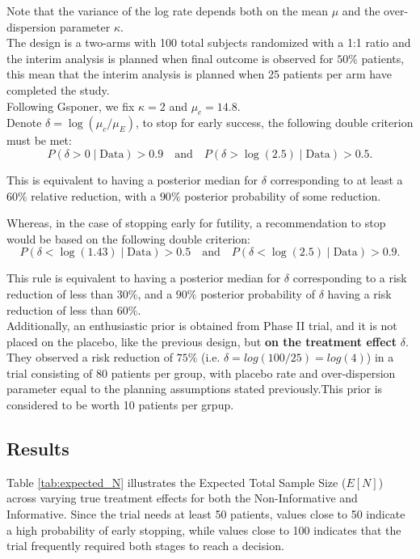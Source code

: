 \documentclass{article}\usepackage[]{graphicx}\usepackage[]{xcolor}
\begin{document}
Note that the variance of the log rate depends both on the mean $\mu$ and the over-dispersion parameter $\kappa$. \\

The design is a two-arms with 100 total subjects randomized with a 1:1 ratio and the interim analysis is planned
when final outcome is observed for $50\%$ patients, this mean that the interim analysis is planned when 25 patients per arm have completed the study.\\
Following Gsponer\cite{gsponer2014bayesian}, we fix $\kappa = 2$ and $\mu_c = 14.8$. \\
Denote $\delta = \log (\mu_c / \mu_E)$, to stop for early success, the following double criterion must be met: 
\[
P(\delta > 0 \mid \mathrm{Data}) > 0.9
\quad\text{and}\quad
P\!\left(\delta > \log(2.5)\mid \mathrm{Data}\right) > 0.5.
\]

This is equivalent to having a posterior median for \(\delta\) corresponding to at least a \(60\%\) relative reduction, with a \(90\%\) posterior probability of some reduction.

Whereas, in the case of stopping early for futility, a recommendation to stop would be based on the following double criterion:
\[
P\!\left(\delta < \log(1.43)\mid \mathrm{Data}\right) > 0.5
\quad\text{and}\quad
P\!\left(\delta < \log(2.5)\mid \mathrm{Data}\right) > 0.9.
\]
 
This rule is equivalent to having a posterior median for \(\delta\) corresponding to a risk reduction of less than \(30\%\), and a \(90\%\) posterior probability of \(\delta\) having a risk reduction of less than \(60\%\).\\

Additionally, an enthusiastic prior is obtained from Phase II trial, and it is not placed on the placebo, like the previous design, but \textbf{on the treatment effect} $\delta$. 
They observed a risk reduction of $75\%$ (i.e. $\delta = log(100/25) = log(4) $) in a trial consisting of 80 patients per group, with placebo rate and over-dispersion parameter equal
to the planning assumptions stated previously.This prior is considered to be worth 10 patients per grpup.\\

\subsection{Results}
Table \ref{tab:expected_N} illustrates the Expected Total Sample Size ($E[N]$) across varying true treatment effects for both the Non-Informative and Informative. Since the trial needs at least 50 patients, 
values close to 50 indicate a high probability of early stopping, while values close to 100 indicates that the trial frequently required both stages to reach a decision.
\end{document}
